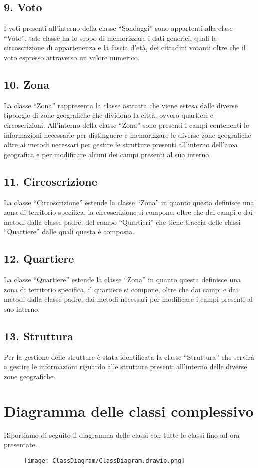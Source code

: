     \subsection*{9. Voto}
        I voti presenti all'interno della classe ``Sondaggi'' sono appartenti alla clase ``Voto'', tale classe ha lo scopo di memorizzare i dati generici, quali la circoscrizione di appartenenza e la fascia d'età, dei cittadini votanti oltre che il voto espresso attraverso un valore numerico.

    \subsection*{10. Zona}
        La classe ``Zona'' rappresenta la classe astratta che viene estesa dalle diverse tipologie di zone geografiche che dividono la città, ovvero quartieri e circoscrizioni. All'interno della classe ``Zona'' sono presenti i campi contenenti le informazioni necessarie per distinguere e memorizzare le diverse zone geografiche oltre ai metodi necessari per gestire le strutture presenti all'interno dell'area geografica e per modificare alcuni dei campi presenti al suo interno.

    \subsection*{11. Circoscrizione}
        La classe ``Circoscrizione'' estende la classe ``Zona'' in quanto questa definisce una zona di territorio specifica, la circoscrizione si compone, oltre che dai campi e dai metodi dalla classe padre, del campo ``Quartieri'' che tiene traccia delle classi ``Quartiere'' dalle quali questa è composta.
    
    \subsection*{12. Quartiere}
        La classe ``Quartiere'' estende la classe ``Zona'' in quanto questa definisce una zona di territorio specifica, il quartiere si compone, oltre che dai campi e dai metodi dalla classe padre, dai metodi necessari per modificare i campi presenti al suo interno.
    
    \subsection*{13. Struttura}
        Per la gestione delle strutture è stata identificata la classe ``Struttura'' che servirà a gestire le informazioni riguardo alle strutture presenti all'interno delle diverse zone geografiche.


\section{Diagramma delle classi complessivo}
    Riportiamo di seguito il diagramma delle classi con tutte le classi fino ad ora presentate.
    \begin{figure}[H]
        \centering
        \texttt{[image: ClassDiagram/ClassDiagram.drawio.png]}
    \end{figure}
